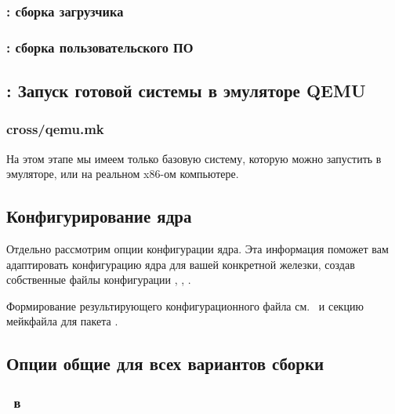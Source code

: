 {\subsubsection{: сборка загрузчика}



\subsubsection{: сборка пользовательского ПО}



\subsection{: Запуск готовой системы в эмуляторе QEMU}

\subsubsection{cross/qemu.mk}

На этом этапе мы имеем только базовую систему, которую можно запустить в
эмуляторе, или на реальном x86-ом компьютере.



\subsection{Конфигурирование ядра}

Отдельно рассмотрим опции конфигурации ядра. Эта информация поможет вам
адаптировать конфигурацию ядра для вашей конкретной железки, создав собственные
файлы конфигурации , ,
.

Формирование результирующего конфигурационного файла см. \ и секцию
мейкфайла для пакета .

\subsection{Опции общие для всех вариантов сборки}

\subsubsection{\ в \ram}

}
